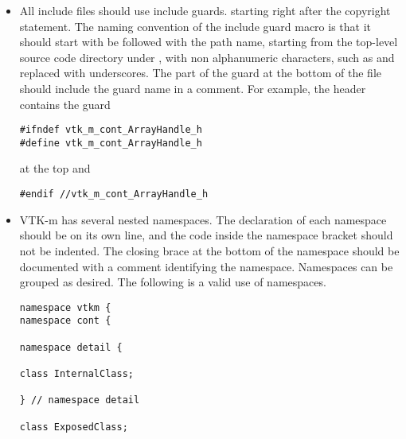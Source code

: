 \begin{itemize}
\item All include files should use include guards. starting right after the
  copyright statement. The naming convention of the include guard macro is
  that it should start with  be followed with the path
  name, starting from the top-level source code directory under
  , with non alphanumeric characters, such as
  \textcode{/} and  replaced with underscores. The
   part of the guard at the bottom of the file should
  include the guard name in a comment. For example, the
   header contains the guard
\begin{verbatim}
#ifndef vtk_m_cont_ArrayHandle_h
#define vtk_m_cont_ArrayHandle_h
\end{verbatim}
  at the top and
\begin{verbatim}
#endif //vtk_m_cont_ArrayHandle_h
\end{verbatim}
\item VTK-m has several nested namespaces. The declaration of each
  namespace should be on its own line, and the code inside the namespace
  bracket should not be indented. The closing brace at the bottom of the
  namespace should be documented with a comment identifying the
  namespace. Namespaces can be grouped as desired. The following is a valid
  use of namespaces.
\begin{verbatim}
namespace vtkm {
namespace cont {

namespace detail {

class InternalClass;

} // namespace detail

class ExposedClass;


\end{verbatim}
\end{itemize}
